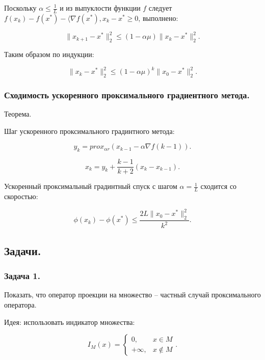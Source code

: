 Поскольку $\alpha\leq\frac1L$ и из выпуклости функции $f$ следует $f(x_k)-f(x^*)-\langle\nabla f(x^*),x_k-x^*\geq0$, выполнено:

\begin{equation}
    \|x_{k+1}-x^*\|_2^2\leq(1-\alpha\mu)\|x_k-x^*\|_2^2.
\end{equation}

Таким образом по индукции:

\begin{equation}
    \|x_k-x^*\|_2^2\leq(1-\alpha\mu)^k\|x_0-x^*\|_2^2.
\end{equation}

\subsubsection*{Сходимость ускоренного проксимального градиентного метода.}

Теорема.

Шаг ускоренного проксимального градинтного метода:

\begin{equation}
    y_k=prox_{\alpha r}(x_{k-1}-\alpha\nabla f({k-1})).
\end{equation}

\begin{equation}
    x_k=y_k+\frac{k-1}{k+2}(x_k-x_{k-1}).
\end{equation}

Ускоренный проксимальный градинтный спуск с шагом $\alpha=\frac1L$ сходится со скоростью:

\begin{equation}
    \phi(x_k)-\phi(x^*)\leq\frac{2L\|x_0-x^*\|_2^2}{k^2}.
\end{equation}

\subsection*{Задачи.}

\subsubsection*{Задача 1.}

Показать, что оператор проекции на множество -- частный случай проксимального оператора.

Идея: использовать индикатор множества:

\begin{equation}
    I_M(x)=\begin{cases}
        0,&x\in M\\
        +\infty,&x\not\in M
    \end{cases}.
\end{equation}


